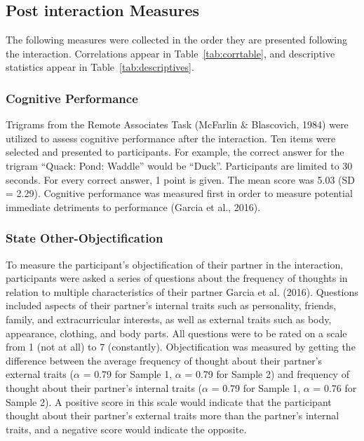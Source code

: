\documentclass[man]{apa6}
\begin{document}
\subsection{Post interaction Measures}\label{post-interaction-measures}

The following measures were collected in the order they are presented
following the interaction. Correlations appear in
Table~\ref{tab:corrtable}, and descriptive statistics appear in
Table~\ref{tab:descriptives}.

\subsubsection{Cognitive Performance}\label{cognitive-performance}

Trigrams from the Remote Associates Task (McFarlin \& Blascovich, 1984)
were utilized to assess cognitive performance after the interaction. Ten
items were selected and presented to participants. For example, the
correct answer for the trigram \enquote{Quack: Pond: Waddle} would be
\enquote{Duck}. Participants are limited to 30 seconds. For every
correct answer, 1 point is given. The mean score was 5.03 (SD = 2.29).
Cognitive performance was measured first in order to measure potential
immediate detriments to performance (Garcia et al., 2016).

\subsubsection{State
Other-Objectification}\label{state-other-objectification}

To measure the participant's objectification of their partner in the
interaction, participants were asked a series of questions about the
frequency of thoughts in relation to multiple characteristics of their
partner Garcia et al. (2016). Questions included aspects of their
partner's internal traits such as personality, friends, family, and
extracurricular interests, as well as external traits such as body,
appearance, clothing, and body parts. All questions were to be rated on
a scale from 1 (not at all) to 7 (constantly). Objectification was
measured by getting the difference between the average frequency of
thought about their partner's external traits (\(\alpha\) = 0.79 for
Sample 1, \(\alpha\) = 0.79 for Sample 2) and frequency of thought about
their partner's internal traits (\(\alpha\) = 0.79 for Sample 1,
\(\alpha\) = 0.76 for Sample 2). A positive score in this scale would
indicate that the participant thought about their partner's external
traits more than the partner's internal traits, and a negative score
would indicate the opposite.
\end{document}
